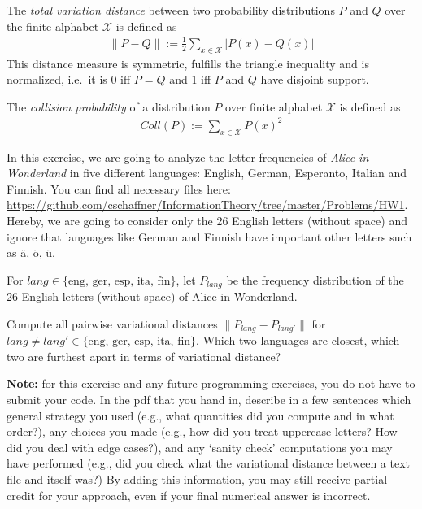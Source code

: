\documentclass[a4paper,10pt,landscape,twocolumn]{scrartcl}
\begin{document}
\newcommand{\lang}{\textit{lang}}
\newcommand{\coll}{\textit{coll}}

\begin{exercise}
The \emph{total variation distance} between two probability distributions $P$ and $Q$
over the finite alphabet $\mathcal{X}$ is defined as 
\begin{align*}
\| P - Q \| := \frac12 \sum_{x \in \mathcal{X} } | P(x) - Q(x) | 
\end{align*}
This distance measure is symmetric, fulfills the triangle inequality and is normalized, i.e.\ it is 0 iff $P=Q$ and 1 iff $P$ and $Q$ have disjoint support.

The \emph{collision probability} of a distribution $P$ over finite alphabet $\mathcal{X}$ is defined as
\begin{align*}
Coll(P) := \sum_{x \in \mathcal{X}} P(x)^2
\end{align*}

In this exercise, we are going to analyze the letter frequencies of \emph{Alice in
  Wonderland} in five different languages: English, German, Esperanto,
Italian and Finnish. You can find all necessary files here: \url{https://github.com/cschaffner/InformationTheory/tree/master/Problems/HW1}. Hereby, we are going to consider only the 26 English letters (without space) and ignore that languages like German and Finnish have important other letters such as {\"a}, {\"o}, {\"u}. 

For $\lang \in \{ \textrm{eng, ger, esp, ita, fin} \}$, let $P_{\lang}$ be the frequency distribution of the 26 English letters (without space) of Alice in Wonderland.

\begin{subex}[(2pt)]
Compute all pairwise variational distances $\| P_{\lang} - P_{\lang'} \|$ for $\lang \neq \lang' \in \{ \textrm{eng, ger, esp, ita, fin} \}$. Which two languages are closest, which two are furthest apart in terms of variational distance?

\textbf{Note:} for this exercise and any future programming exercises, you do not have to submit your code. In the pdf that you hand in, describe in a few sentences which general strategy you used (e.g., what quantities did you compute and in what order?), any choices you made (e.g., how did you treat uppercase letters? How did you deal with edge cases?), and any `sanity check' computations you may have performed (e.g., did you check what the variational distance between a text file and itself was?) By adding this information, you may still receive partial credit for your approach, even if your final numerical answer is incorrect.
\end{subex}


\end{exercise}
\end{document}

